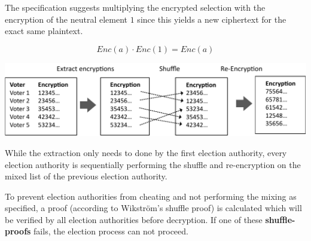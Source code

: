 The specification suggests multiplying the encrypted selection with the encryption of the neutral element $1$ since this yields a new ciphertext for the exact same plaintext.

\begin{equation*}Enc(a) \cdot Enc(1) = Enc(a)\end{equation*}

\begin{center}
\includegraphics[scale=0.95]{assets/mixing.pdf}
\label{During the mixing}
\end{center}

While the extraction only needs to done by the first election authority, every election authority is sequentially performing the shuffle and re-encryption on the mixed list of the previous election authority.

To prevent election authorities from cheating and not performing the mixing as specified, a proof (according to Wikström’s shuffle proof) is calculated which will be verified by all election authorities before decryption. If one of these \textbf{shuffle-proofs} fails, the election process can not proceed.
